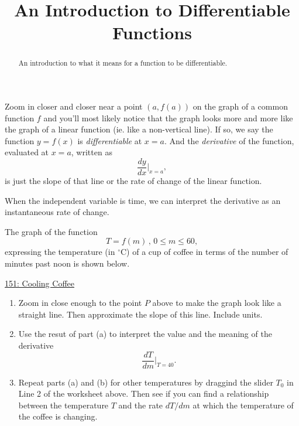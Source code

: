 \documentclass{ximera}
\title{An Introduction to Differentiable Functions}
\begin{document}
\begin{abstract}
An introduction to what it means for a function to be differentiable.
\end{abstract}
\maketitle




Zoom in closer and closer near a point $(a,f(a))$ on the graph of a common function $f$ and you'll most likely notice that the graph looks more and more like the graph of a linear function (ie. like a non-vertical line). If so, we say the function $y=f(x)$ is \emph{differentiable} at $x=a$. And the \emph{derivative} of the function, evaluated at $x=a$, written as
\[
     \frac{dy}{dx}\Big|_{x=a},
\]
is just the slope of that line or the rate of change of the linear function.

When the independent variable is time, we can interpret the derivative as an instantaneous rate of change.

\begin{example}  \label{Ex:KJDmft4thghhgdf}
The graph of the function 
\[
   T = f(m) \, ,  \, 0\leq m \leq 60,
\]
expressing the temperature (in $^\circ$C) of a cup of coffee in terms of the number of minutes past noon is shown below.

\begin{onlineOnly}
    \begin{center}
\end{center}
\end{onlineOnly}

\href{https://www.desmos.com/calculator/fuftb4mq0k}{151: Cooling Coffee}


\begin{enumerate}
\item Zoom in close enough to the point $P$ above to make the graph look like a straight line. Then approximate the slope of this line. Include units.

\item Use the resut of part (a) to interpret the value and the meaning of the derivative
\[
   \frac{dT}{dm} \Big|_{T=40} .
\]

\item Repeat parts (a) and (b) for other temperatures by draggind the slider $T_0$ in Line 2 of the worksheet above. Then see if you can find a relationship between the temperature $T$ and the rate $dT/dm$ at which the temperature of the coffee is changing. 

\end{enumerate}
\end{example}
\end{document}
